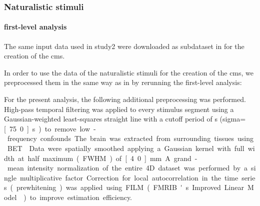 {\subsubsection{Naturalistic stimuli}



\paragraph{first-level analysis}


The same input data used in study2 were downloaded as subdataset in
\citep{haeusler2021ppadata} for the creation of the \ac{cms}.

%
In order to use the data of the naturalistic stimuli for the creation of the
\ac{cms}, we preprocessed them in the same way as in
\citep{haeusler2022processing} by rerunning the first-level analysis:


For the present analysis, the following additional preprocessing was performed.
High-pass temporal filtering was applied to every stimulus segment using a
Gaussian-weighted least-squares straight line with a cutoff period of
\unit[150]{s} (sigma=\unit[75.0]{s}) to remove low-frequency confounds.
The brain was extracted from surrounding tissues using BET \citep{smith2002bet}.
Data were spatially smoothed applying a Gaussian kernel with full width at half
maximum (FWHM) of \unit[4.0]{mm}.
A grand-mean intensity normalization of the entire 4D dataset was performed by a
single multiplicative factor.
Correction for local autocorrelation in the time series (prewhitening) was
applied using FILM (FMRIB's Improved Linear Model \citep{woolrich2001autocorr})
to improve estimation efficiency.


}
